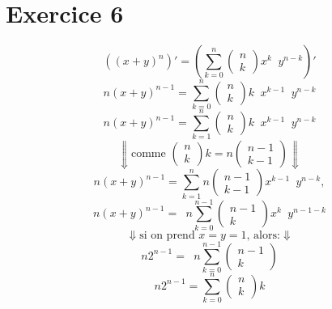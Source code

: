 \documentclass[fontsize=10pt]{article}
\begin{document}
\section*{Exercice 6}
$$ \left((x+y)^{n}\right)'
= \left(\underset{k=0}{\overset{n}{\sum}}
\begin{pmatrix} 
n\\
k
\end{pmatrix}x^{k}\phantom{a}y^{n-k}\right)' $$
$$ n(x+y)^{n-1}
= \underset{k=0}{\overset{n}{\sum}}
\begin{pmatrix} 
n\\
k
\end{pmatrix}k\phantom{a}x^{k-1}\phantom{a}y^{n-k} $$
$$ n(x+y)^{n-1}
= \underset{k=1}{\overset{n}{\sum}}
\begin{pmatrix} 
n\\
k
\end{pmatrix}k\phantom{a}x^{k-1}\phantom{a}y^{n-k} $$
$$\Downarrow \text{comme } \begin{pmatrix} 
n\\
k
\end{pmatrix}k
= n\begin{pmatrix} 
n-1\\
k-1
\end{pmatrix} \Downarrow$$
$$ n(x+y)^{n-1}
= \underset{k=1}{\overset{n}{\sum}}
n\begin{pmatrix} 
n-1\\
k-1
\end{pmatrix}x^{k-1}\phantom{a}y^{n-k}, $$
$$ n(x+y)^{n-1}
= \phantom{a}n
\underset{k=0}{\overset{n-1}{\sum}}
\begin{pmatrix} 
n-1\\
k
\end{pmatrix}x^{k}\phantom{a}y^{n-1-k} $$
$$\Downarrow \text{si on prend $x=y=1$, alors:} \Downarrow$$
$$ n2^{n-1}
= \phantom{a}n
\underset{k=0}{\overset{n-1}{\sum}}
\begin{pmatrix} 
n-1\\
k
\end{pmatrix} $$
$$ n2^{n-1}
= \underset{k=0}{\overset{n}{\sum}}
\begin{pmatrix} 
n\\
k
\end{pmatrix}k $$
\end{document}
